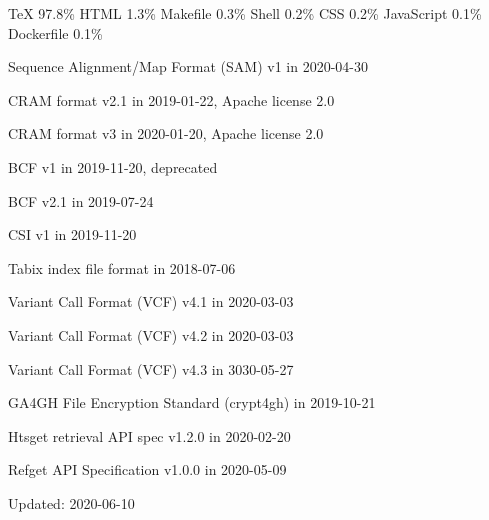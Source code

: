 \documentclass[]{article}
\begin{document}
TeX 97.8\% HTML 1.3\% Makefile 0.3\% Shell 0.2\% CSS 0.2\% JavaScript 0.1\% Dockerfile 0.1\% 

Sequence Alignment/Map Format (SAM) v1 in 2020-04-30

CRAM format v2.1 in 2019-01-22, Apache license 2.0

CRAM format v3 in 2020-01-20, Apache license 2.0

BCF v1 in 2019-11-20, deprecated

BCF v2.1 in 2019-07-24

CSI v1 in 2019-11-20

Tabix index file format in 2018-07-06

Variant Call Format (VCF) v4.1 in 2020-03-03

Variant Call Format (VCF) v4.2 in 2020-03-03

Variant Call Format (VCF) v4.3 in 3030-05-27

GA4GH File Encryption Standard (crypt4gh) in 2019-10-21

Htsget retrieval API spec v1.2.0 in 2020-02-20

Refget API Specification v1.0.0 in 2020-05-09

Updated: 2020-06-10
\end{document}
